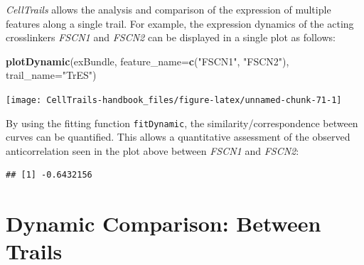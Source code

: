\documentclass[]{book}
\newenvironment{Shaded}{\begin{snugshade}}{\end{snugshade}}
\newcommand{\KeywordTok}[1]{\textcolor[rgb]{0.13,0.29,0.53}{\textbf{#1}}}
\newcommand{\DataTypeTok}[1]{\textcolor[rgb]{0.13,0.29,0.53}{#1}}
\newcommand{\StringTok}[1]{\textcolor[rgb]{0.31,0.60,0.02}{#1}}
\newcommand{\CommentTok}[1]{\textcolor[rgb]{0.56,0.35,0.01}{\textit{#1}}}
\newcommand{\OperatorTok}[1]{\textcolor[rgb]{0.81,0.36,0.00}{\textbf{#1}}}
\newcommand{\NormalTok}[1]{#1}
\theoremstyle{definition}
\theoremstyle{definition}
\theoremstyle{definition}
\theoremstyle{remark}
\begin{document}
\emph{CellTrails} allows the analysis and comparison of the expression
of multiple features along a single trail. For example, the expression
dynamics of the acting crosslinkers \emph{FSCN1} and \emph{FSCN2} can be
displayed in a single plot as follows:

\begin{Shaded}
\begin{Highlighting}[]
\KeywordTok{plotDynamic}\NormalTok{(exBundle, }\DataTypeTok{feature_name=}\KeywordTok{c}\NormalTok{(}\StringTok{"FSCN1"}\NormalTok{, }\StringTok{"FSCN2"}\NormalTok{), }\DataTypeTok{trail_name=}\StringTok{"TrES"}\NormalTok{)}
\end{Highlighting}
\end{Shaded}

\texttt{[image: CellTrails-handbook\_files/figure-latex/unnamed-chunk-71-1]}

By using the fitting function \texttt{fitDynamic}, the
similarity/correspondence between curves can be quantified. This allows
a quantitative assessment of the observed anticorrelation seen in the
plot above between \emph{FSCN1} and \emph{FSCN2}:

\begin{Shaded}
\end{Shaded}

\begin{verbatim}
## [1] -0.6432156
\end{verbatim}

\section{Dynamic Comparison: Between
Trails}\label{dynamic-comparison-between-trails}
\end{document}
